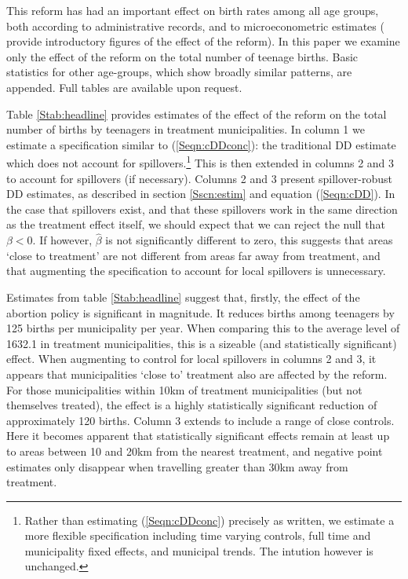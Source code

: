 This reform has had an important effect on birth rates among all age groups,
both according to administrative records, and to microeconometric estimates
(\citet{ClarkeMuhlrad2014} provide introductory figures of the effect of the
reform).  In this paper we examine only the effect of the reform on the total
number of teenage births.  Basic statistics for other age-groups, which show 
broadly similar patterns, are appended.  Full tables are available upon 
request.

Table \ref{Stab:headline} provides estimates of the effect of the reform on
the total number of births by teenagers in treatment municipalities.  In 
column 1 we estimate a specification similar to (\ref{Seqn:cDDconc}): the 
traditional DD estimate which does not account for spillovers.\footnote{Rather 
than estimating (\ref{Seqn:cDDconc}) precisely as written, we estimate a more 
flexible specification including time varying controls, full time and
municipality fixed effects, and municipal trends.  The intution however is
unchanged.}  This is then extended in columns 2 and 3 to account for spillovers
(if necessary).  Columns 2 and 3 present spillover-robust DD estimates, as 
described in section \ref{Sscn:estim} and equation (\ref{Seqn:cDD}).  In the
case that spillovers exist, and that these spillovers work in the same 
direction as the treatment effect itself, we should expect that we can reject
the null that $\beta<0$.  If however, $\hat\beta$ is not significantly 
different to zero, this suggests that areas `close to treatment' are not
different from areas far away from treatment, and that augmenting the 
specification to account for local spillovers is unnecessary.



Estimates from table \ref{Stab:headline} suggest that, firstly, the effect of
the abortion policy is significant in magnitude.  It reduces births among 
teenagers by 125 births per municipality per year. When comparing this to the
average level of 1632.1 in treatment municipalities, this is a sizeable (and
statistically significant) effect.  When augmenting to control for local
spillovers in columns 2 and 3, it appears that municipalities `close to' 
treatment also are affected by the reform.  For those municipalities within
10km of treatment municipalities (but not themselves treated), the effect is 
a highly statistically significant reduction of approximately 120 births.
Column 3 extends to include a range of close controls.  Here it becomes
apparent that statistically significant effects remain at least up to areas
between 10 and 20km from the nearest treatment, and negative point estimates
only disappear when travelling greater than 30km away from treatment.

